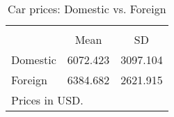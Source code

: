 \begin{table}[htbp]\centering
\caption{Car prices: Domestic vs. Foreign}
\def\sym#1{\ifmmode^{#1}\else\(^{#1}\)\fi}
\begin{tabular} {l*{1}{cc}}
\toprule 
&\multicolumn{2}{c}{}          \\
& Mean & SD                            \\
\midrule
Domestic &  6072.423 &  3097.104\\
Foreign &  6384.682 &  2621.915\\
\bottomrule
\multicolumn{3}{l}{\footnotesize Prices in USD.} \\
\end{tabular}
\end{table}
